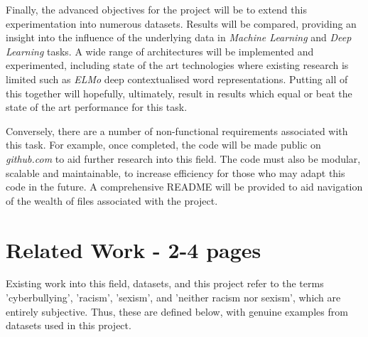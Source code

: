 \documentclass[12pt,a4paper]{article}
\begin{document}
Finally, the advanced objectives for the project will be to extend this experimentation into numerous datasets. Results will be compared, providing an insight into the influence of the underlying data in \textit{Machine Learning} and \textit{Deep Learning} tasks. A wide range of architectures will be implemented and experimented, including state of the art technologies where existing research is limited such as \textit{ELMo} deep contextualised word representations. Putting all of this together will hopefully, ultimately, result in results which equal or beat the state of the art performance for this task.

Conversely, there are a number of non-functional requirements associated with this task. For example, once completed, the code will be made public on \textit{github.com} to aid further research into this field. The code must also be modular, scalable and maintainable, to increase efficiency for those who may adapt this code in the future. A comprehensive README will be provided to aid navigation of the wealth of files associated with the project.




\section{Related Work - 2-4 pages}

Existing work into this field, datasets, and this project refer to the terms 'cyberbullying', 'racism', 'sexism', and 'neither racism nor sexism', which are entirely subjective. Thus, these are defined below, with genuine examples from datasets used in this project.
\end{document}
